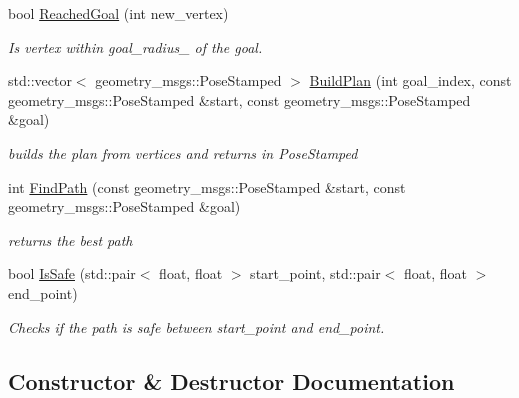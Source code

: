 \begin{DoxyCompactItemize}
bool \hyperlink{classturtlebot__rrt_1_1RRTPlanner_a86f3447362049feed7251a99d0c2a4a4}{Reached\+Goal} (int new\+\_\+vertex)
\begin{DoxyCompactList}\small\item\em Is vertex within goal\+\_\+radius\+\_\+ of the goal. \end{DoxyCompactList}\item 
std\+::vector$<$ geometry\+\_\+msgs\+::\+Pose\+Stamped $>$ \hyperlink{classturtlebot__rrt_1_1RRTPlanner_a91ceb6a9aa57b6e18df4e74bd95a07b3}{Build\+Plan} (int goal\+\_\+index, const geometry\+\_\+msgs\+::\+Pose\+Stamped \&start, const geometry\+\_\+msgs\+::\+Pose\+Stamped \&goal)
\begin{DoxyCompactList}\small\item\em builds the plan from vertices and returns in Pose\+Stamped \end{DoxyCompactList}\item 
int \hyperlink{classturtlebot__rrt_1_1RRTPlanner_a6e4ef816e70c37f222da73fa40b78b38}{Find\+Path} (const geometry\+\_\+msgs\+::\+Pose\+Stamped \&start, const geometry\+\_\+msgs\+::\+Pose\+Stamped \&goal)
\begin{DoxyCompactList}\small\item\em returns the best path \end{DoxyCompactList}\item 
bool \hyperlink{classturtlebot__rrt_1_1RRTPlanner_a969afbff1661ae9a6738159065f280a0}{Is\+Safe} (std\+::pair$<$ float, float $>$ start\+\_\+point, std\+::pair$<$ float, float $>$ end\+\_\+point)
\begin{DoxyCompactList}\small\item\em Checks if the path is safe between start\+\_\+point and end\+\_\+point. \end{DoxyCompactList}\end{DoxyCompactItemize}


\subsection{Constructor \& Destructor Documentation}

